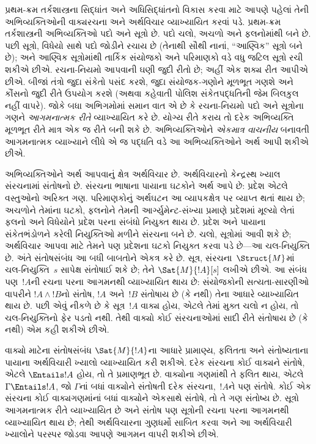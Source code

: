 પ્રથમ-ક્રમ તર્કશાસ્ત્રના સિદ્ધાંત અને
અધિસિદ્ધાંતનો વિકાસ કરવા માટે આપણે
પહેલાં તેની અભિવ્યક્તિઓની વાક્યરચના
અને અર્થવિચાર વ્યાખ્યાયિત કરવાં પડે.
પ્રથમ-ક્રમ તર્કશાસ્ત્રની અભિવ્યક્તિઓ
પદો અને સૂત્રો છે. પદો
ચલો, અચળો અને
ફલનોમાંથી બને છે.
પછી સૂત્રો, વિધેયો
સાથે પદો જોડીને રચાય છે
(તેનાથી સૌથી નાનાં, “આણ્વિક”
સૂત્રો બને છે); અને આણ્વિક
સૂત્રોમાંથી તાર્કિક સંયોજકો
અને પરિમાણકો વડે વધુ જટિલ
સૂત્રો રચી શકીએ છીએ.
રચના-નિયમો આપવાની ઘણી જુદી
રીતો છે; અહીં એક શક્ય
રીત આપીએ છીએ. બીજાં તંત્રો
જુદા સંકેતો પસંદ કરશે,
જુદા સંયોજક-ગણોને મૂળભૂત
ગણશે અને કૌંસનો જુદી
રીતે ઉપયોગ કરશે
(અથવા કહેવાતી પોલિશ
સંકેતપદ્ધતિની જેમ બિલકુલ
નહીં વાપરે). જોકે બધા
અભિગમોમાં સમાન વાત
એ છે કે રચના-નિયમો
પદો અને સૂત્રોના ગણને
\emph{આગમનાત્મક રીતે}
વ્યાખ્યાયિત કરે છે.
યોગ્ય રીતે કરાય તો
દરેક અભિવ્યક્તિ મૂળભૂત
રીતે માત્ર એક જ રીતે
બની શકે છે. અભિવ્યક્તિઓને
\emph{એકમાત્ર વાચનીય}
બનાવતી આગમનાત્મક
વ્યાખ્યાને લીધે એ જ
પદ્ધતિ વડે આ
અભિવ્યક્તિઓને અર્થ
આપી શકીએ છીએ.

અભિવ્યક્તિઓને અર્થ આપવાનું ક્ષેત્ર
અર્થવિચાર છે. અર્થવિચારનો કેન્દ્રસ્થ
ખ્યાલ સંરચનામાં સંતોષનો છે.
સંરચના ભાષાના પાયાના
ઘટકોને અર્થ આપે છે:
પ્રદેશ એટલે વસ્તુઓનો
અરિક્ત ગણ. પરિમાણકોનું
અર્થઘટન આ વ્યાપકક્ષેત્ર
પર વ્યાપ્ત થતાં થાય છે;
અચળોને તેમાંના ઘટકો,
ફલનોને તેમની આર્ગ્યુમેન્ટ-સંખ્યા પ્રમાણે
પ્રદેશમાં મૂલ્યો લેતાં ફલનો અને
વિધેયોને પ્રદેશ
પરના સંબંધો નિયુક્ત થાય છે.
પ્રદેશ અને પાયાના
સંકેતભંડોળને કરેલી નિયુક્તિઓ
મળીને સંરચના બને છે.
ચલો, સૂત્રોમાં
આવી શકે છે; અર્થવિચાર
આપવા માટે તેમને પણ
પ્રદેશના ઘટકો
નિયુક્ત કરવા પડે છે—આ
ચલ-નિયુક્તિ છે. અંતે
સંતોષસંબંધ આ બધી બાબતોને
એકત્ર કરે છે. સૂત્ર,
સંરચના~$\Struct{M}$માં
ચલ-નિયુક્તિ~$s$ સાપેક્ષ
સંતોષાઈ શકે છે; તેને
$\Sat{M}{!A}[s]$ લખીએ છીએ.
આ સંબંધ પણ~$!A$ની
રચના પરના આગમનથી
વ્યાખ્યાયિત થાય છે:
સંયોજકોની સત્યતા-સારણીઓ
વાપરીને $!A \land !B$નો
સંતોષ, $!A$ અને~$!B$
સંતોષાય છે (કે નથી)
તેના આધારે વ્યાખ્યાયિત
થાય છે. પછી એવું
નીકળે છે કે
સૂત્ર~$!A$
વાક્ય હોય,
એટલે તેમાં મુક્ત
ચલો ન હોય, તો
ચલ-નિયુક્તિનો ફેર
પડતો નથી. તેથી
વાક્યો કોઈ
સંરચનાઓમાં
સાદી રીતે સંતોષાય
છે (કે નથી) એમ
કહી શકીએ છીએ.

વાક્યો માટેના સંતોષસંબંધ
$\Sat{M}{!A}$ના આધારે
પ્રામાણ્ય, ફલિતતા અને
સંતોષ્યતાના પાયાના
અર્થવિચારી ખ્યાલો
વ્યાખ્યાયિત કરી શકીએ.
દરેક સંરચના કોઈ
વાક્યને સંતોષે,
એટલે $\Entails !A$
હોય, તો તે પ્રમાણભૂત છે.
વાક્યોના ગણમાંથી
તે ફલિત થાય, એટલે
$\Gamma \Entails !A$,
જો $\Gamma$નાં
બધાં વાક્યોને
સંતોષતી દરેક
સંરચના,~$!A$ને
પણ સંતોષે. કોઈ એક
સંરચના કોઈ
વાક્યગણમાંનાં બધાં
વાક્યોને
એકસાથે સંતોષે,
તો તે ગણ સંતોષ્ય છે.
સૂત્રો આગમનાત્મક
રીતે વ્યાખ્યાયિત છે
અને સંતોષ પણ
સૂત્રોની રચના
પરના આગમનથી
વ્યાખ્યાયિત થાય છે;
તેથી અર્થવિચારના
ગુણધર્મો સાબિત
કરવા અને આ
અર્થવિચારી ખ્યાલોને
પરસ્પર જોડવા આપણે
આગમન વાપરી શકીએ છીએ.
\endgroup



